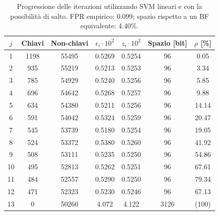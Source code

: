 \begin{table}
\centering
\begin{tabular}{|c|c|c|c|c|c|c|}
\hline
$j$ & Chiavi & Non-chiavi & $\epsilon_i \cdot 10^2$ & $z_i \cdot 10^2$ & Spazio [bit] & $\rho$ [\%] \\
\hline
1 & 1198 & 55495 & 0.5269 & 0.5254 & 96 & 0.05 \\
2 & 935 & 55219 & 0.5213 & 0.5253 & 96 & 3.34 \\
3 & 785 & 54929 & 0.5240 & 0.5256 & 96 & 5.85 \\
4 & 696 & 54642 & 0.5268 & 0.5257 & 96 & 9.88 \\
5 & 634 & 54380 & 0.5211 & 0.5256 & 96 & 14.14 \\
6 & 591 & 54042 & 0.5324 & 0.5259 & 96 & 20.47 \\
7 & 545 & 53739 & 0.5180 & 0.5254 & 96 & 19.05 \\
8 & 524 & 53372 & 0.5380 & 0.5260 & 96 & 41.92 \\
9 & 508 & 53111 & 0.5235 & 0.5250 & 96 & 54.86 \\
10 & 495 & 52813 & 0.5262 & 0.5251 & 96 & 67.61 \\
11 & 484 & 52557 & 0.5290 & 0.5250 & 96 & 79.34 \\
12 & 471 & 52323 & 0.5230 & 0.5246 & 96 & 67.13 \\
13 & 0 & 50260 & 4.072 & 4.122 & 3126 & (100) \\
\hline
\end{tabular}
\caption{Progressione delle iterazioni utilizzando SVM lineari e con la possibilità di salto. FPR empirico: 0.099; spazio rispetto a un BF equivalente: 4.40\%.}
\label{tab:svm-skip}
\end{table}
